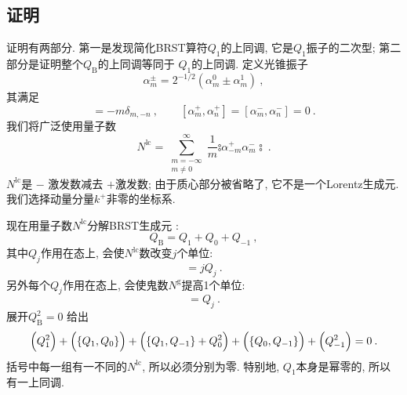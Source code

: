 \subsection*{证明}
证明有两部分. 第一是发现简化BRST算符$Q_{1}$的上同调, 它是$Q_{1}$振子的二次型; 第二部分是证明整个$Q_{\mathrm{B}}$的上同调等同于 $Q_{1}$的上同调. 
定义光锥振子
\begin{equation}
\alpha_{m}^{\pm}=2^{-1 / 2} (\alpha_{m}^{0} \pm \alpha_{m}^{1}) \:, \label{4.4.6}
\end{equation}
其满足
\begin{equation}
[\alpha_{m}^{+}, \alpha_{n}^{-}]=-m \delta_{m,-n} \:, \qquad [\alpha_{m}^{+}, \alpha_{n}^{+}]=[\alpha_{m}^{-}, \alpha_{n}^{-}]=0 \:. \label{4.4.7}
\end{equation}
我们将广泛使用量子数
\begin{equation}
N^{\mathrm{lc}}=\sum_{\substack{m=-\infty  \\  m \neq 0}}^{\infty} \frac{1}{m} \mathrel{\typecolon \alpha_{-m}^{+} \alpha_{m}^{-} \typecolon} \:. \label{4.4.8}
\end{equation}
$N^{\mathrm{lc}}$是 $-$ 激发数减去 $+$激发数; 由于质心部分被省略了, 它不是一个Lorentz生成元. 我们选择动量分量$k^{+}$非零的坐标系.

现在用量子数$N^{\mathrm{lc}}$分解BRST生成元 :
\begin{equation}
Q_{\mathrm{B}}=Q_{1}+Q_{0}+Q_{-1} \:, \label{4.4.9}
\end{equation}
其中$Q_{j}$作用在态上, 会使$N^{\mathrm{lc}}$数改变$j$个单位: 
\begin{equation}
[N^{\mathrm{lc}}, Q_{j}]=j Q_{j} \:. \label{4.4.10}
\end{equation}
另外每个$Q_{j}$作用在态上, 会使鬼数$N^{\mathrm{g}}$提高1个单位: 
\begin{equation}
[N^{\mathrm{g}}, Q_{j}]=Q_{j} \:. \label{4.4.11}
\end{equation}
展开$Q_{\mathrm{B}}^{2}=0$ 给出
\begin{equation}
\Bigl(Q_{1}^{2}\Bigr)+ \Bigl(\{Q_{1}, Q_{0}\}\Bigr)+\Bigl(\{Q_{1}, Q_{-1}\}+Q_{0}^{2}\Bigr)+\Bigl(\{Q_{0}, Q_{-1}\}\Bigr)+\Bigl(Q_{-1}^{2}\Bigr)=0 \:. 
\label{4.4.12}
\end{equation}
括号中每一组有一不同的$N^{\mathrm{lc}}$, 所以必须分别为零. 特别地, $Q_{1}$本身是幂零的, 所以有一上同调.

